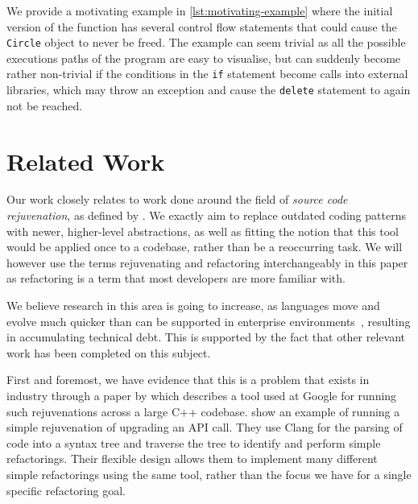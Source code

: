\documentclass{mpaper}
\begin{document}
    We provide a motivating example in \autoref{lst:motivating-example} where the initial version of the function has several control flow statements that could cause the \texttt{Circle} object to never be freed.
    The example can seem trivial as all the possible executions paths of the program are easy to visualise, but can suddenly become rather non-trivial if the conditions in the \texttt{if} statement become calls into external libraries, which may throw an exception and cause the \texttt{delete} statement to again not be reached.

    


    \section{Related Work}\label{sec:related-work}
    
    Our work closely relates to work done around the field of \emph{source code rejuvenation}, as defined by \citet{Pirkelbauer2010}. 
    We exactly aim to replace outdated coding patterns with newer, higher-level abstractions, as well as fitting the notion that this tool would be applied once to a codebase, rather than be a reoccurring task.
    We will however use the terms rejuvenating and refactoring interchangeably in this paper as refactoring is a term that most developers are more familiar with.
    
    We believe research in this area is going to increase, as languages move and evolve much quicker than can be supported in enterprise environments~\cite{Overbey2009, Favre2005}, resulting in accumulating technical debt. 
    This is supported by the fact that other relevant work has been completed on this subject.
    
    First and foremost, we have evidence that this is a problem that exists in industry through a paper by \citet{Wright2013} which describes a tool used at Google for running such rejuvenations across a large C++ codebase. 
    \citet{Wright2013} show an example of running a simple rejuvenation of upgrading an API call.
    They use Clang for the parsing of code into a syntax tree and traverse the tree to identify and perform simple refactorings.
    Their flexible design allows them to implement many different simple refactorings using the same tool, rather than the focus we have for a single specific refactoring goal.
\end{document}
